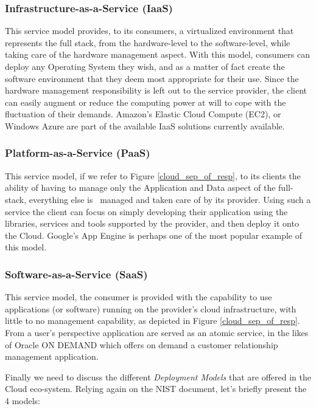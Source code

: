\documentclass[11pt]{amsart}
\begin{document}
	\subsubsection{Infrastructure-as-a-Service (IaaS)}
	This service model provides, to its consumers, a virtualized environment that represents the 
	full stack, from the hardware-level to the software-level, while taking care of the hardware 
	management aspect. With this model, consumers can deploy any Operating System they wish, and as a
	matter of fact create the software environment that they deem most appropriate for their use. 
	Since the hardware management responsibility is left out to the service provider, the client can 
	easily augment or reduce the computing power at will to cope with the fluctuation of their 
	demands. Amazon's Elastic Cloud Compute (EC2), or Windows Azure are part of the available IaaS 
	solutions currently available.
	
	\subsubsection{Platform-as-a-Service (PaaS)}
	This service model, if we refer to Figure \ref{cloud_sep_of_resp}, to its clients the ability of 
	having to manage only the Application and Data aspect of the full-stack, everything else is \
	managed and taken care of by its provider. Using such a service the client can focus on simply 
	developing their application using the libraries, services and tools supported by the provider, 
	and then deploy it onto the Cloud. Google's App Engine is perhaps one of the most popular example 
	of this model.
	
	\subsubsection{Software-as-a-Service (SaaS)}
	This service model, the consumer is provided with the capability to use applications (or 
	software) running on the provider's cloud infrastructure, with little to no management 
	capability, as depicted in Figure \ref{cloud_sep_of_resp}. From a user's perspective application 
	are served as an atomic service, in the likes of Oracle ON DEMAND which offers on demand a 
	customer relationship management application.
	
	Finally we need to discuss the different \emph{Deployment Models} that are offered in the Cloud 
	eco-system. Relying again on the NIST \cite{nist} document, let's briefly present the 4 models:
	
\end{document}
